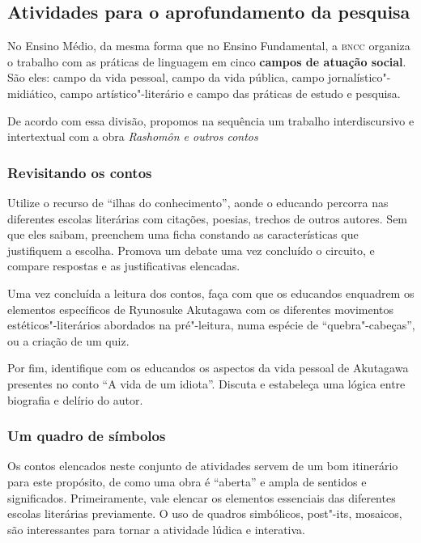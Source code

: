 \documentclass[12pt]{extarticle}
\begin{document}
\subsection{Atividades para o aprofundamento da pesquisa}


No Ensino Médio, da mesma forma que no Ensino Fundamental, a \textsc{bncc}
organiza o trabalho com as práticas de linguagem em cinco \textbf{campos de
atuação social}. São eles: campo da vida pessoal, campo da vida pública, campo
jornalístico"-midiático, campo artístico"-literário e campo das práticas de
estudo e pesquisa.

De acordo com essa divisão, propomos na sequência um trabalho interdiscursivo e
intertextual com a obra \emph{Rashomôn e outros contos}

\subsubsection{Revisitando os contos}

Utilize o recurso de ``ilhas do conhecimento'', aonde o educando percorra nas
diferentes escolas literárias com citações, poesias, trechos de outros autores.
Sem que eles saibam, preenchem uma ficha constando as características que
justifiquem a escolha. Promova um debate uma vez concluído o circuito, e
compare respostas e as justificativas elencadas.

Uma vez concluída a leitura dos contos, faça com que os educandos enquadrem os
elementos específicos de Ryunosuke Akutagawa com os diferentes movimentos
estéticos"-literários abordados na pré"-leitura, numa espécie de
``quebra"-cabeças'', ou a criação de um quiz.

Por fim, identifique com os educandos os aspectos da vida pessoal de Akutagawa
presentes no conto ``A vida de um idiota''. Discuta e estabeleça uma lógica entre
biografia e delírio do autor.

\subsubsection{Um quadro de símbolos}

Os contos elencados neste conjunto de atividades servem de um bom itinerário
para este propósito, de como uma obra é ``aberta'' e ampla de sentidos e
significados. Primeiramente, vale elencar os elementos essenciais das
diferentes escolas literárias previamente. O uso de quadros simbólicos,
post"-its, mosaicos, são interessantes para tornar a atividade lúdica e
interativa.
\end{document}
